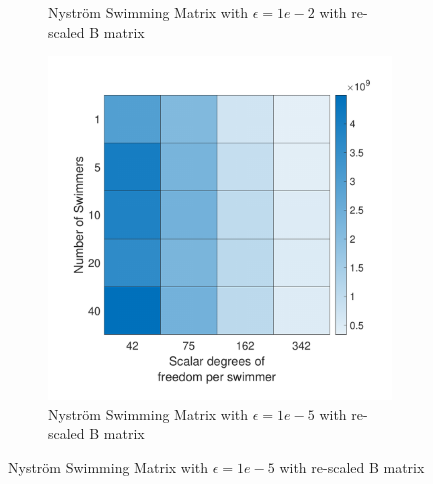 \begin{figure}
\begin{subfigure}{0.3\textwidth}
        \caption{Nyström Swimming Matrix with $\epsilon=1e-2$ with re-scaled B matrix}
    \end{subfigure}
    \begin{subfigure}{0.3\textwidth}
        \includegraphics[width=\linewidth]{Images/Condition/Mobility Matrix with rescaled total B Matrix-5.pdf}
        \caption{Nyström Swimming Matrix with $\epsilon=1e-5$ with re-scaled B matrix}
    \end{subfigure}
\end{figure}


